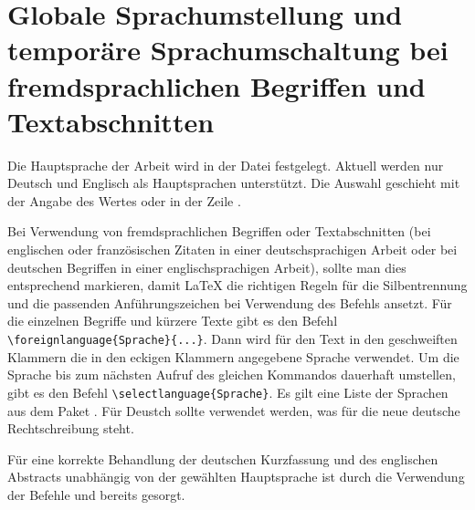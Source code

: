 \section[Globale Sprachumstellung und temporäre Sprachumschaltung]{Globale Sprachumstellung und temporäre Sprachumschaltung bei fremdsprachlichen Begriffen und Textabschnitten}%
%
%
%
%
\label{sec:Sprache}
%
Die Hauptsprache der Arbeit wird in der Datei  festgelegt.
Aktuell werden nur Deutsch und Englisch als Hauptsprachen unterstützt.
Die Auswahl geschieht mit der Angabe des Wertes  oder 
in der Zeile .

Bei Verwendung von fremdsprachlichen Begriffen oder Textabschnitten
(\zB bei englischen oder französischen Zitaten in einer deutschsprachigen Arbeit
oder bei deutschen Begriffen in einer englischsprachigen Arbeit),
sollte man dies entsprechend markieren,
damit \LaTeX{} die richtigen Regeln für die Silbentrennung
und die passenden Anführungszeichen bei Verwendung des Befehls
 ansetzt.
Für die einzelnen Begriffe und kürzere Texte gibt es den Befehl
\verb+\foreignlanguage{Sprache}{...}+.
Dann wird für den Text in den geschweiften Klammern die in den eckigen Klammern angegebene Sprache verwendet.
Um die Sprache bis zum nächsten Aufruf des gleichen Kommandos dauerhaft umstellen,
gibt es den Befehl \verb+\selectlanguage{Sprache}+.
Es gilt eine Liste der Sprachen aus dem Paket .
Für Deustch sollte  verwendet werden, was für die
neue deutsche Rechtschreibung steht.

Für eine korrekte Behandlung der deutschen Kurzfassung und des englischen Abstracts
unabhängig von der gewählten Hauptsprache ist durch die Verwendung der Befehle
 und  bereits gesorgt.